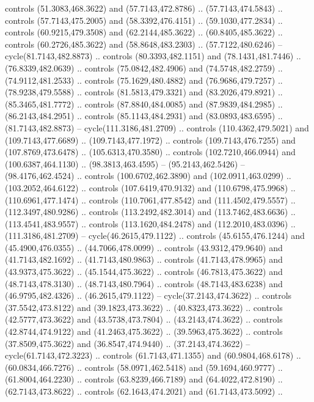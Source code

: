 \begin{scope}[shift={(58.28571,-442.36218)}]
    controls (51.3083,468.3622) and (57.7143,472.8786) .. (57.7143,474.5843) ..
    controls (57.7143,475.2005) and (58.3392,476.4151) .. (59.1030,477.2834) ..
    controls (60.9215,479.3508) and (62.2144,485.3622) .. (60.8405,485.3622) ..
    controls (60.2726,485.3622) and (58.8648,483.2303) .. (57.7122,480.6246) --
    cycle(81.7143,482.8873) .. controls (80.3393,482.1151) and (78.1431,481.7446)
    .. (76.8339,482.0639) .. controls (75.0842,482.4906) and (74.5748,482.2759) ..
    (74.9112,481.2533) .. controls (75.1629,480.4882) and (76.9686,479.7257) ..
    (78.9238,479.5588) .. controls (81.5813,479.3321) and (83.2026,479.8921) ..
    (85.3465,481.7772) .. controls (87.8840,484.0085) and (87.9839,484.2985) ..
    (86.2143,484.2951) .. controls (85.1143,484.2931) and (83.0893,483.6595) ..
    (81.7143,482.8873) -- cycle(111.3186,481.2709) .. controls (110.4362,479.5021)
    and (109.7143,477.6689) .. (109.7143,477.1972) .. controls (109.7143,476.7255)
    and (107.8769,473.6478) .. (105.6313,470.3580) .. controls (102.7210,466.0944)
    and (100.6387,464.1130) .. (98.3813,463.4595) -- (95.2143,462.5426) --
    (98.4176,462.4524) .. controls (100.6702,462.3890) and (102.0911,463.0299) ..
    (103.2052,464.6122) .. controls (107.6419,470.9132) and (110.6798,475.9968) ..
    (110.6961,477.1474) .. controls (110.7061,477.8542) and (111.4502,479.5557) ..
    (112.3497,480.9286) .. controls (113.2492,482.3014) and (113.7462,483.6636) ..
    (113.4541,483.9557) .. controls (113.1620,484.2478) and (112.2010,483.0396) ..
    (111.3186,481.2709) -- cycle(46.2615,479.1122) .. controls (45.6155,476.1244)
    and (45.4900,476.0355) .. (44.7066,478.0099) .. controls (43.9312,479.9640)
    and (41.7143,482.1692) .. (41.7143,480.9863) .. controls (41.7143,478.9965)
    and (43.9373,475.3622) .. (45.1544,475.3622) .. controls (46.7813,475.3622)
    and (48.7143,478.3130) .. (48.7143,480.7964) .. controls (48.7143,483.6238)
    and (46.9795,482.4326) .. (46.2615,479.1122) -- cycle(37.2143,474.3622) ..
    controls (37.5542,473.8122) and (39.1823,473.3622) .. (40.8323,473.3622) ..
    controls (42.5777,473.3622) and (43.5738,473.7804) .. (43.2143,474.3622) ..
    controls (42.8744,474.9122) and (41.2463,475.3622) .. (39.5963,475.3622) ..
    controls (37.8509,475.3622) and (36.8547,474.9440) .. (37.2143,474.3622) --
    cycle(61.7143,472.3223) .. controls (61.7143,471.1355) and (60.9804,468.6178)
    .. (60.0834,466.7276) .. controls (58.0971,462.5418) and (59.1694,460.9777) ..
    (61.8004,464.2230) .. controls (63.8239,466.7189) and (64.4022,472.8190) ..
    (62.7143,473.8622) .. controls (62.1643,474.2021) and (61.7143,473.5092) ..

\end{scope}
